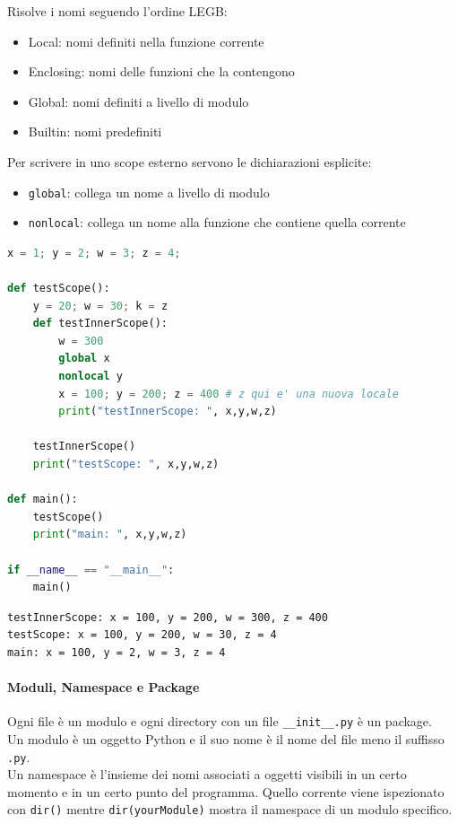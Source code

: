 \documentclass[12pt]{extarticle}
\begin{document}
\noindent Risolve i nomi seguendo l'ordine LEGB:
\begin{itemize}
    \item Local: nomi definiti nella funzione corrente
    \item Enclosing: nomi delle funzioni che la contengono
    \item Global: nomi definiti a livello di modulo
    \item Builtin: nomi predefiniti
\end{itemize}
Per scrivere in uno scope esterno servono le dichiarazioni esplicite:
\begin{itemize}
    \item \texttt{global}: collega un nome a livello di modulo
    \item \texttt{nonlocal}: collega un nome alla funzione che contiene quella corrente
\end{itemize}

\begin{lstlisting}[language=Python]
x = 1; y = 2; w = 3; z = 4;

def testScope():
    y = 20; w = 30; k = z
    def testInnerScope():
        w = 300
        global x
        nonlocal y
        x = 100; y = 200; z = 400 # z qui e' una nuova locale
        print("testInnerScope: ", x,y,w,z)

    testInnerScope()
    print("testScope: ", x,y,w,z)

def main():
    testScope()
    print("main: ", x,y,w,z)

if __name__ == "__main__":
    main()
\end{lstlisting}
\begin{lstlisting}
testInnerScope: x = 100, y = 200, w = 300, z = 400
testScope: x = 100, y = 200, w = 30, z = 4
main: x = 100, y = 2, w = 3, z = 4
\end{lstlisting}

\paragraph{Moduli, Namespace e Package} Ogni file è un modulo e ogni directory con un file \texttt{\_\_init\_\_.py} è un package.\\

\noindent Un modulo è un oggetto Python e il suo nome è il nome del file meno il suffisso \texttt{.py}.\\

\noindent Un namespace è l'insieme dei nomi associati a oggetti visibili in un certo momento e in un certo punto del programma. Quello corrente viene ispezionato con \texttt{dir()} mentre \texttt{dir(yourModule)} mostra il namespace di un modulo specifico.\\
\end{document}
